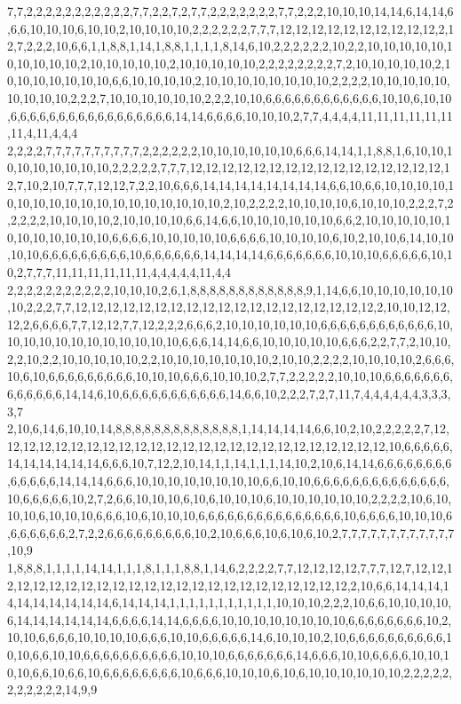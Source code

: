 7,7,2,2,2,2,2,2,2,2,2,2,2,7,7,2,2,7,2,7,7,2,2,2,2,2,2,2,7,7,2,2,2,10,10,10,14,14,6,14,14,6,6,6,10,10,10,6,10,10,2,10,10,10,10,2,2,2,2,2,2,7,7,7,12,12,12,12,12,12,12,12,12,12,2,12,7,2,2,2,10,6,6,1,1,8,8,1,14,1,8,8,1,1,1,1,8,14,6,10,2,2,2,2,2,2,10,2,2,10,10,10,10,10,10,10,10,10,10,2,10,10,10,10,10,2,10,10,10,10,10,2,2,2,2,2,2,2,2,7,2,10,10,10,10,10,2,10,10,10,10,10,10,10,6,6,10,10,10,10,2,10,10,10,10,10,10,10,10,2,2,2,2,10,10,10,10,10,10,10,10,10,2,2,2,7,10,10,10,10,10,10,2,2,2,10,10,6,6,6,6,6,6,6,6,6,6,6,6,10,10,6,10,10,6,6,6,6,6,6,6,6,6,6,6,6,6,6,6,6,6,14,14,6,6,6,6,10,10,10,2,7,7,4,4,4,4,11,11,11,11,11,11,11,4,11,4,4,4
2,2,2,2,7,7,7,7,7,7,7,7,7,7,2,2,2,2,2,2,10,10,10,10,10,10,6,6,6,14,14,1,1,8,8,1,6,10,10,10,10,10,10,10,10,10,2,2,2,2,2,7,7,7,12,12,12,12,12,12,12,12,12,12,12,12,12,12,12,12,12,7,10,2,10,7,7,7,12,12,7,2,2,10,6,6,6,14,14,14,14,14,14,14,14,6,6,10,6,6,10,10,10,10,10,10,10,10,10,10,10,10,10,10,10,10,10,10,2,10,2,2,2,2,10,10,10,10,6,10,10,10,2,2,2,7,2,2,2,2,2,10,10,10,10,2,10,10,10,10,6,6,14,6,6,10,10,10,10,10,10,6,6,2,10,10,10,10,10,10,10,10,10,10,10,10,6,6,6,6,10,10,10,10,10,6,6,6,6,10,10,10,10,6,10,2,10,10,6,14,10,10,10,10,6,6,6,6,6,6,6,6,6,10,6,6,6,6,6,6,14,14,14,14,6,6,6,6,6,6,6,10,10,10,6,6,6,6,6,10,10,2,7,7,7,11,11,11,11,11,11,4,4,4,4,4,11,4,4
2,2,2,2,2,2,2,2,2,2,2,10,10,10,2,6,1,8,8,8,8,8,8,8,8,8,8,8,8,9,1,14,6,6,10,10,10,10,10,10,10,2,2,2,7,7,12,12,12,12,12,12,12,12,12,12,12,12,12,12,12,12,12,12,12,2,10,10,12,12,12,2,6,6,6,6,7,7,12,12,7,7,12,2,2,2,6,6,6,2,10,10,10,10,10,10,6,6,6,6,6,6,6,6,6,6,6,6,10,10,10,10,10,10,10,10,10,10,10,10,6,6,6,14,14,6,6,10,10,10,10,10,6,6,6,2,2,7,7,2,10,10,2,2,10,2,2,10,10,10,10,10,2,2,10,10,10,10,10,10,10,2,10,10,2,2,2,2,10,10,10,10,2,6,6,6,10,6,10,6,6,6,6,6,6,6,6,6,10,10,10,6,6,6,10,10,10,2,7,7,2,2,2,2,2,10,10,10,6,6,6,6,6,6,6,6,6,6,6,6,6,14,14,6,10,6,6,6,6,6,6,6,6,6,6,6,14,6,6,10,2,2,2,7,2,7,11,7,4,4,4,4,4,4,3,3,3,3,7
2,10,6,14,6,10,10,14,8,8,8,8,8,8,8,8,8,8,8,8,8,1,14,14,14,14,6,6,10,2,10,2,2,2,2,2,7,12,12,12,12,12,12,12,12,12,12,12,12,12,12,12,12,12,12,12,12,12,12,12,12,12,10,6,6,6,6,6,14,14,14,14,14,14,6,6,6,10,7,12,2,10,14,1,1,14,1,1,1,14,10,2,10,6,14,14,6,6,6,6,6,6,6,6,6,6,6,6,6,14,14,14,6,6,6,10,10,10,10,10,10,10,10,6,6,10,10,6,6,6,6,6,6,6,6,6,6,6,6,6,6,10,6,6,6,6,6,10,2,7,2,6,6,10,10,10,6,10,6,10,10,10,6,10,10,10,10,10,10,2,2,2,2,10,6,10,10,10,6,10,10,10,6,6,6,10,6,10,10,10,6,6,6,6,6,6,6,6,6,6,6,6,6,6,6,10,6,6,6,6,10,10,10,6,6,6,6,6,6,6,2,7,2,2,6,6,6,6,6,6,6,6,6,10,2,10,6,6,6,10,6,10,6,10,2,7,7,7,7,7,7,7,7,7,7,7,7,10,9
1,8,8,8,1,1,1,1,14,14,1,1,1,8,1,1,1,8,8,1,14,6,2,2,2,2,7,7,12,12,12,12,7,7,7,12,7,12,12,12,12,12,12,12,12,12,12,12,12,12,12,12,12,12,12,12,12,12,12,12,12,2,10,6,6,14,14,14,14,14,14,14,14,14,14,6,14,14,14,1,1,1,1,1,1,1,1,1,1,1,10,10,10,2,2,2,10,6,6,10,10,10,10,6,14,14,14,14,14,14,6,6,6,6,14,14,6,6,6,6,10,10,10,10,10,10,10,10,6,6,6,6,6,6,6,6,10,2,10,10,6,6,6,6,10,10,10,10,6,6,6,10,10,6,6,6,6,6,14,6,10,10,10,2,10,6,6,6,6,6,6,6,6,6,6,10,10,6,6,10,10,6,6,6,6,6,6,6,6,6,6,10,10,10,6,6,6,6,6,6,6,14,6,6,6,10,10,6,6,6,6,10,10,10,10,6,6,10,6,6,10,6,6,6,6,6,6,6,6,10,6,6,6,10,10,10,6,10,6,10,10,10,10,10,10,2,2,2,2,2,2,2,2,2,2,2,14,9,9

